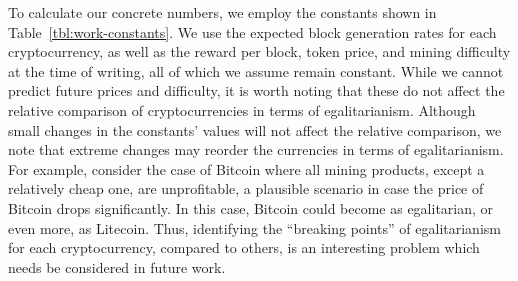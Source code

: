 To calculate our concrete numbers, we employ the constants shown in
Table~\ref{tbl:work-constants}. We use the expected block generation rates for
each cryptocurrency, as well as the reward per block, token price, and mining
difficulty at the time of writing, all of which we assume remain constant.
While we cannot predict future prices and difficulty, it is worth noting that
these do not affect the relative comparison of cryptocurrencies in terms of
egalitarianism.  Although small
changes in the constants' values will not affect the relative comparison, we
note that extreme changes may reorder the currencies in terms of
egalitarianism. For example, consider the case of Bitcoin where all mining
products, except a relatively cheap one, are unprofitable, a plausible scenario
in case \eg the price of Bitcoin drops significantly. In this case, Bitcoin
could become as egalitarian, or even more, as \eg Litecoin. Thus, identifying
the ``breaking points'' of egalitarianism for each cryptocurrency, compared to
others, is an interesting problem which needs be considered in future work.

\begin{table}
  \centering
  \caption{A list of the parameters used in our proof-of-work mining simulations. Some parameters are system-agnostic, whereas others depend on the cryptocurrency $c$.}
  \label{tbl:work-constants}
\end{table}

